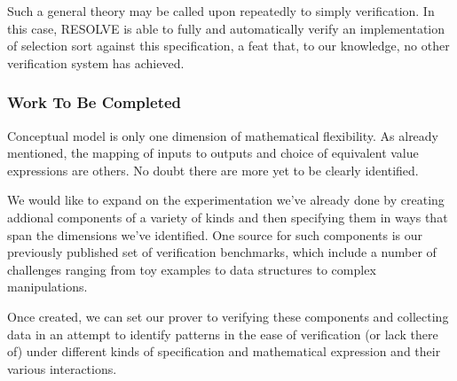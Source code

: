 Such a general theory may be called upon repeatedly to simply verification.  In this case, RESOLVE is able to fully and automatically verify an implementation of selection sort against this specification, a feat that, to our knowledge, no other verification system has achieved.

\subsubsection{Work To Be Completed}
Conceptual model is only one dimension of mathematical flexibility.  As already mentioned, the mapping of inputs to outputs and choice of equivalent value expressions are others.  No doubt there are more yet to be clearly identified.

We would like to expand on the experimentation we've already done by creating addional components of a variety of kinds and then specifying them in ways that span the dimensions we've identified.  One source for such components is our previously published set of verification benchmarks\cite{Benchmarks}, which include a number of challenges ranging from toy examples to data structures to complex manipulations.

Once created, we can set our prover to verifying these components and collecting data in an attempt to identify patterns in the ease of verification (or lack there of) under different kinds of specification and mathematical expression and their various interactions.
